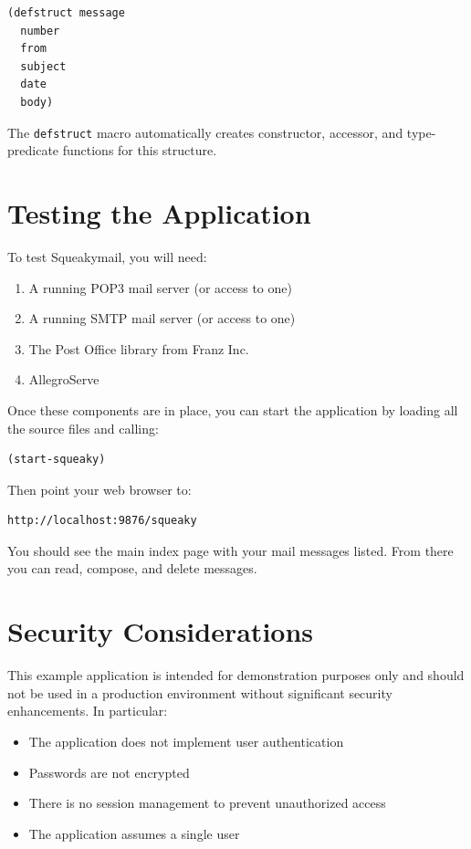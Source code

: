 \begin{verbatim}
(defstruct message
  number
  from
  subject
  date
  body)
\end{verbatim}

The \texttt{defstruct} macro automatically creates constructor, accessor, and type-predicate functions for this structure.

\section{Testing the Application}

To test Squeakymail, you will need:

\begin{enumerate}
\item A running POP3 mail server (or access to one)
\item A running SMTP mail server (or access to one)
\item The Post Office library from Franz Inc.
\item AllegroServe
\end{enumerate}

Once these components are in place, you can start the application by loading all the source
files and calling:

\begin{verbatim}
(start-squeaky)
\end{verbatim}

Then point your web browser to:

\begin{verbatim}
http://localhost:9876/squeaky
\end{verbatim}

You should see the main index page with your mail messages listed. From there you can
read, compose, and delete messages.

\section{Security Considerations}

This example application is intended for demonstration purposes only and should not be used
in a production environment without significant security enhancements. In particular:

\begin{itemize}
\item The application does not implement user authentication
\item Passwords are not encrypted
\item There is no session management to prevent unauthorized access
\item The application assumes a single user
\end{itemize}

